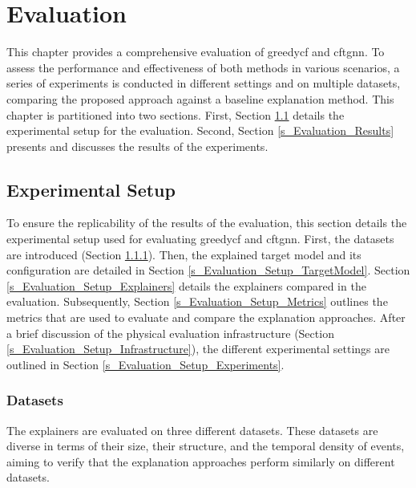 \section{Evaluation}
\label{s_Evaluation}

This chapter provides a comprehensive evaluation of \gls{greedycf} and \gls{cftgnn}. To assess the performance and effectiveness of both methods in various scenarios, a series of experiments is conducted in different settings and on multiple datasets, comparing the proposed approach against a baseline explanation method. This chapter is partitioned into two sections. First, Section \ref{s_Evaluation_Setup} details the experimental setup for the evaluation. Second, Section \ref{s_Evaluation_Results} presents and discusses the results of the experiments.

\subsection{Experimental Setup}
\label{s_Evaluation_Setup}

To ensure the replicability of the results of the evaluation, this section details the experimental setup used for evaluating \gls{greedycf} and \gls{cftgnn}. First, the datasets are introduced (Section \ref{s_Evaluation_Setup_Datasets}). Then, the explained target model and its configuration are detailed in Section \ref{s_Evaluation_Setup_TargetModel}. Section \ref{s_Evaluation_Setup_Explainers} details the explainers compared in the evaluation. Subsequently, Section \ref{s_Evaluation_Setup_Metrics} outlines the metrics that are used to evaluate and compare the explanation approaches. After a brief discussion of the physical evaluation infrastructure (Section \ref{s_Evaluation_Setup_Infrastructure}), the different experimental settings are outlined in Section \ref{s_Evaluation_Setup_Experiments}.

\subsubsection{Datasets}
\label{s_Evaluation_Setup_Datasets}

The explainers are evaluated on three different datasets. These datasets are diverse in terms of their size, their structure, and the temporal density of events, aiming to verify that the explanation approaches perform similarly on different datasets.

